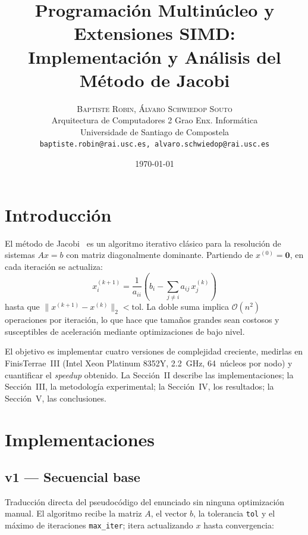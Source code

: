\documentclass[a4paper,twocolumn]{article}
\title{Programación Multinúcleo y Extensiones SIMD:\\[4pt]
       Implementación y Análisis del Método de Jacobi}
\author{%
  \textsc{Baptiste Robin, Álvaro Schwiedop Souto}\\[0.5ex]
  \normalsize Arquitectura de Computadores \textbullet{} 2\textordmasculine{} Grao Enx. Informática\\
  \normalsize Universidade de Santiago de Compostela\\
  \normalsize \texttt{baptiste.robin@rai.usc.es, alvaro.schwiedop@rai.usc.es}
}
\date{\today}
\begin{document}
\maketitle

\section{Introducción}

El método de Jacobi~\cite{saad2003} es un algoritmo iterativo clásico para la
resolución de sistemas $Ax{=}b$ con matriz diagonalmente dominante.  Partiendo de
$x^{(0)}{=}\mathbf{0}$, en cada iteración se actualiza:
\[
  x_i^{(k+1)} = \frac{1}{a_{ii}}\!\left(b_i - \sum_{j \neq i} a_{ij}\,x_j^{(k)}\right)
\]
hasta que $\|x^{(k+1)}-x^{(k)}\|_2 < \text{tol}$.  La doble suma implica
$\mathcal{O}(n^2)$ operaciones por iteración, lo que hace que tamaños grandes
sean costosos y susceptibles de aceleración mediante optimizaciones de bajo nivel.

El objetivo es implementar cuatro versiones de complejidad creciente, medirlas en
FinisTerrae~III (Intel Xeon Platinum 8352Y, 2.2~GHz, 64~núcleos por nodo) y
cuantificar el \textit{speedup} obtenido.  La Sección~II describe las
implementaciones; la Sección~III, la metodología experimental; la Sección~IV,
los resultados; la Sección~V, las conclusiones.

\section{Implementaciones}

\subsection{v1 --- Secuencial base}

Traducción directa del pseudocódigo del enunciado sin ninguna
optimización manual. El algoritmo recibe la matriz $A$, el vector
$b$, la tolerancia \texttt{tol} y el máximo de iteraciones
\texttt{max\_iter}; itera actualizando $x$ hasta convergencia:
\end{document}
